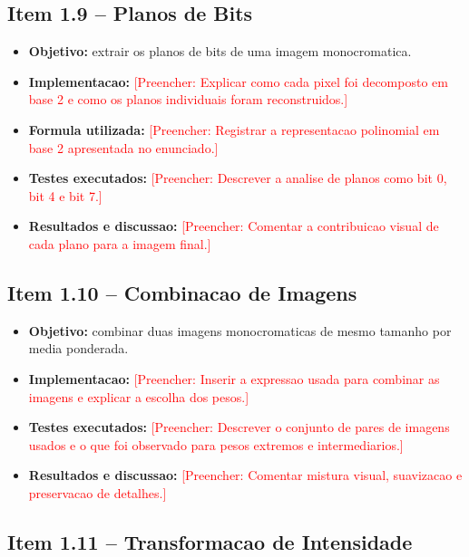 \documentclass[12pt,a4paper]{article}
\newcommand{\placeholder}[1]{\textcolor{red}{[Preencher: #1]}}
\begin{document}
\subsection{Item 1.9 -- Planos de Bits}

\begin{itemize}[leftmargin=*]
  \item \textbf{Objetivo:} extrair os planos de bits de uma imagem monocromatica.
  \item \textbf{Implementacao:} \placeholder{Explicar como cada pixel foi decomposto em base 2 e como os planos individuais foram reconstruidos.}
  \item \textbf{Formula utilizada:} \placeholder{Registrar a representacao polinomial em base 2 apresentada no enunciado.}
  \item \textbf{Testes executados:} \placeholder{Descrever a analise de planos como bit 0, bit 4 e bit 7.}
  \item \textbf{Resultados e discussao:} \placeholder{Comentar a contribuicao visual de cada plano para a imagem final.}
\end{itemize}

\subsection{Item 1.10 -- Combinacao de Imagens}

\begin{itemize}[leftmargin=*]
  \item \textbf{Objetivo:} combinar duas imagens monocromaticas de mesmo tamanho por media ponderada.
  \item \textbf{Implementacao:} \placeholder{Inserir a expressao usada para combinar as imagens e explicar a escolha dos pesos.}
  \item \textbf{Testes executados:} \placeholder{Descrever o conjunto de pares de imagens usados e o que foi observado para pesos extremos e intermediarios.}
  \item \textbf{Resultados e discussao:} \placeholder{Comentar mistura visual, suavizacao e preservacao de detalhes.}
\end{itemize}

\subsection{Item 1.11 -- Transformacao de Intensidade}
\end{document}
